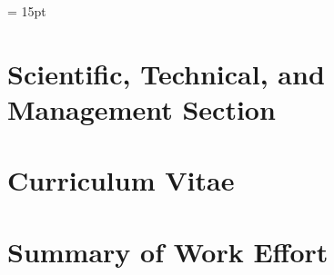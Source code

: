 \documentclass[12pt]{article}
\begin{document}


\setlength{\baselineskip}{0.96\baselineskip} %
\setlength{\parskip}{1.\parskip}

\parindent = 15pt

\tableofcontents

\setcounter{page}{0}
\setcounter{figure}{0}

\newpage

\section{Scientific, Technical, and Management Section}



\vspace{-0.22in}
%


\vspace{-0.22in}




\vspace{-0.22in}



\vspace{-0.22in}



\vspace{-0.22in}



\vspace{-0.22in}



\vspace{-0.22in}



\newpage



\newpage

\section{Curriculum Vitae}
\label{sec:cv}

\newpage
\addtocounter{page}{8}
\section{Summary of Work Effort}
\label{sec:workeffort}

\end{document}
